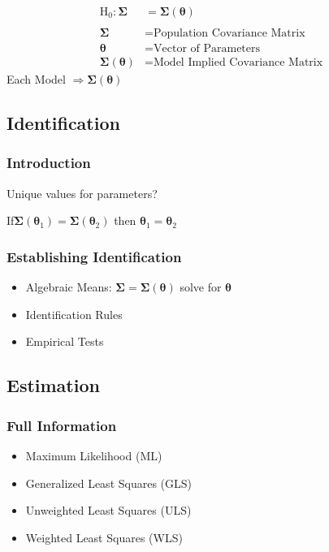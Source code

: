 \begin{align*}
\text{H}_{0}:\bm{\Sigma} & =\bm{\Sigma}\left(\bm{\theta}\right)\\
\\
\bm{\Sigma} & =\text{Population Covariance Matrix}\\
\bm{\theta} & =\text{Vector of Parameters}\\
\bm{\Sigma}\left(\bm{\theta}\right) & =\text{Model Implied Covariance Matrix}
\end{align*}
Each Model \(\Rightarrow\)\(\bm{\Sigma}\left(\bm{\theta}\right)\)

\subsection{Identification}

\subsubsection{Introduction}

Unique values for parameters?

If\(\bm{\Sigma}\left(\bm{\theta}_{1}\right)=\bm{\Sigma}\left(\bm{\theta}_{2}\right)\)
then \(\bm{\theta}_{1}=\bm{\theta}_{2}\)

\subsubsection{Establishing Identification}
\begin{itemize}
\item Algebraic Means: $\bm{\Sigma}=\bm{\Sigma}\left(\bm{\theta}\right)$
solve for $\bm{\theta}$
\item Identification Rules
\item Empirical Tests
\end{itemize}

\subsection{Estimation}

\subsubsection{Full Information}
\begin{itemize}
\item Maximum Likelihood (ML)
\item Generalized Least Squares (GLS)
\item Unweighted Least Squares (ULS)
\item Weighted Least Squares (WLS)
\end{itemize}

